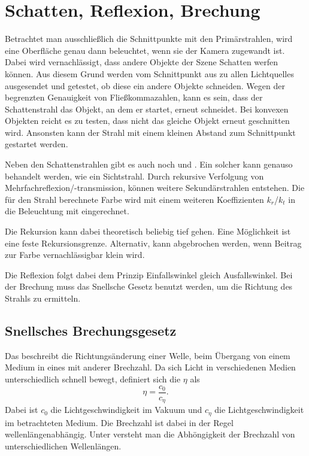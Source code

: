 \section{Schatten, Reflexion, Brechung}
Betrachtet man ausschließlich die Schnittpunkte mit den Primärstrahlen, wird eine Oberfläche genau dann beleuchtet, wenn sie der Kamera zugewandt ist.
Dabei wird vernachlässigt, dass andere Objekte der Szene Schatten werfen können.
Aus diesem Grund werden vom Schnittpunkt aus  zu allen Lichtquelles ausgesendet und getestet, ob diese ein andere Objekte schneiden.
Wegen der begrenzten Genauigkeit von Fließkommazahlen, kann es sein, dass der Schattenstrahl das Objekt, an dem er startet, erneut schneidet.
Bei konvexen Objekten reicht es zu testen, dass nicht das gleiche Objekt erneut geschnitten wird.
Ansonsten kann der Strahl \zB mit einem kleinen Abstand zum Schnittpunkt gestartet werden.

Neben den Schattenstrahlen gibt es auch noch  und .
Ein solcher kann genauso behandelt werden, wie ein Sichtstrahl.
Durch rekursive Verfolgung von Mehrfachreflexion/-transmission, können weitere Sekundärstrahlen entstehen.
Die für den Strahl berechnete Farbe wird mit einem weiteren Koeffizienten $k_r$/$k_t$ in die Beleuchtung mit eingerechnet.

Die Rekursion kann dabei theoretisch beliebig tief gehen.
Eine Möglichkeit ist eine feste Rekursionsgrenze.
Alternativ, kann abgebrochen werden, wenn Beitrag zur Farbe vernachlässigbar klein wird.

Die Reflexion folgt dabei dem Prinzip Einfallswinkel gleich Ausfallswinkel.
Bei der Brechung muss das Snellsche Gesetz benutzt werden, um die Richtung des Strahls zu ermitteln.

\subsection{Snellsches Brechungsgesetz}
Das  beschreibt die Richtungsänderung einer Welle, beim Übergang von einem Medium in eines mit anderer Brechzahl.
Da sich Licht in verschiedenen Medien unterschiedlich schnell bewegt, definiert sich die  $\eta$ als
\[
	\eta = \frac{c_0}{c_\eta} \text{.}
\]
Dabei ist $c_0$ die Lichtgeschwindigkeit im Vakuum und $c_\eta$ die Lichtgeschwindigkeit im betrachteten Medium.
Die Brechzahl ist dabei in der Regel wellenlängenabhängig.
Unter  versteht man die Abhöngigkeit der Brechzahl von unterschiedlichen Wellenlängen.

